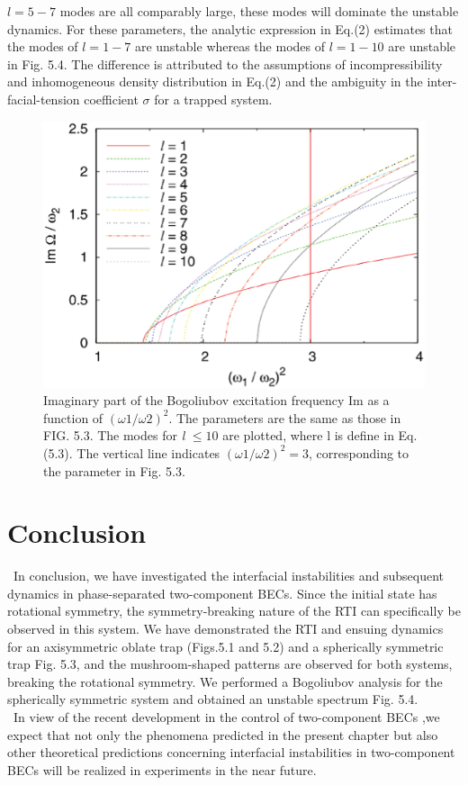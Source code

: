 \documentclass[12pt,a4paper]{report}
\begin{document}
$l=5-7$ modes are all comparably large, these modes will
dominate the unstable dynamics. For these parameters, the
analytic expression in Eq.(2) estimates that the modes of $l=1-7$
are unstable whereas the modes of $l=1-10$ are unstable
in Fig. 5.4. The difference is attributed to the assumptions of
incompressibility and inhomogeneous density distribution in
Eq.(2) and the ambiguity in the inter-facial-tension coefficient
$\sigma$ for a trapped system.
\begin{figure}[htbp]
\begin{center}
\includegraphics[scale=0.50,keepaspectratio]{5-4.eps}
\caption{
Imaginary part of the Bogoliubov excitation 
frequency Im as a function of $( \omega 1 / \omega 2 )^2$. The parameters
are the same as those in FIG. 5.3. The modes for {\it l} $\le 10$ are plotted,
where l is define in Eq. (5.3). The vertical line indicates $( \omega 1 / \omega 2 )^2 = 3$,
corresponding to the parameter in Fig. 5.3.
}
\label{FIG:5-4}
\end{center}
\end{figure}

\section{Conclusion}
\ In conclusion, we have investigated the interfacial instabilities
and subsequent dynamics in phase-separated two-component
BECs. Since the initial state has rotational symmetry,
the symmetry-breaking nature of the RTI can specifically
be observed in this system. We have demonstrated the RTI and
ensuing dynamics for an axisymmetric oblate trap (Figs.5.1 and 5.2)
and a spherically symmetric trap Fig. 5.3, and the
mushroom-shaped patterns are observed for both systems,
breaking the rotational symmetry. We performed a Bogoliubov
analysis for the spherically symmetric system and obtained an
unstable spectrum Fig. 5.4.
\\
\ In view of the recent development in the control of 
two-component BECs \cite{72}\cite{75}\cite{76},we expect that not only the 
phenomena predicted in the present chapter but also other
theoretical predictions \cite{62}\cite{63}\cite{64}\cite{65}\cite{77}\cite{78}\cite{79}\cite{80}
concerning interfacial instabilities in
two-component BECs will be realized in experiments in the near future.
\end{document}
